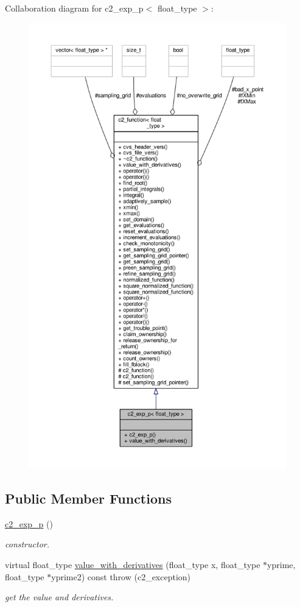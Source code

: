 Collaboration diagram for c2\+\_\+exp\+\_\+p$<$ float\+\_\+type $>$\+:
\nopagebreak
\begin{figure}[H]
\begin{center}
\leavevmode
\includegraphics[height=550pt]{classc2__exp__p__coll__graph}
\end{center}
\end{figure}
\subsection*{Public Member Functions}
\begin{DoxyCompactItemize}
\item 
\hyperlink{classc2__exp__p_ae74cc4a62b953936481e8a8bfa265d25}{c2\+\_\+exp\+\_\+p} ()
\begin{DoxyCompactList}\small\item\em constructor. \end{DoxyCompactList}\item 
virtual float\+\_\+type \hyperlink{classc2__exp__p_a1c5cb28b65356b2f2290ae11d651f93e}{value\+\_\+with\+\_\+derivatives} (float\+\_\+type x, float\+\_\+type $\ast$yprime, float\+\_\+type $\ast$yprime2) const   throw (c2\+\_\+exception)
\begin{DoxyCompactList}\small\item\em get the value and derivatives. \end{DoxyCompactList}\end{DoxyCompactItemize}
